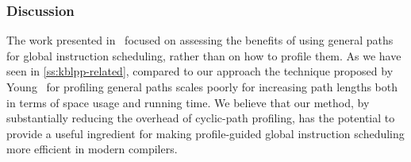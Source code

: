 \subsubsection*{Discussion}
The work presented in~\cite{Young98} focused on assessing the benefits of using general paths for global instruction scheduling, rather than on how to profile them. As we have seen in \mysection\ref{ss:kblpp-related}, compared to our approach the technique proposed by Young~\cite{Young98thesis} for profiling general paths scales poorly for increasing path lengths both in terms of space usage and running time. %
We believe that our method, by substantially reducing the overhead of cyclic-path profiling, has the potential to provide a useful ingredient for making profile-guided global instruction scheduling more efficient in modern compilers.

